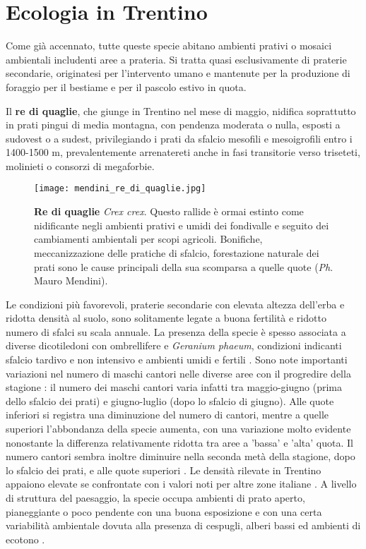\documentclass[10pt,twoside,openany,x11names,svgnames,italian,a5paper,dvipsnames,table]{memoir}
\newcommand{\ph}{\emph{Ph}. }
\begin{document}
\section{Ecologia in Trentino}
Come già accennato, tutte queste specie abitano ambienti prativi o mosaici ambientali includenti aree a prateria. Si tratta quasi esclusivamente di praterie secondarie, originatesi per l'intervento umano e mantenute per la produzione di foraggio per il bestiame e per il pascolo estivo in quota. 


Il \textbf{re di quaglie}, che giunge in Trentino nel mese di maggio, nidifica  soprattutto in prati pingui di media montagna, con pendenza moderata o nulla, esposti a sudovest o a sudest, privilegiando i prati da sfalcio mesofili e mesoigrofili entro i 1400-1500 m, prevalentemente arrenatereti anche in fasi transitorie verso triseteti, molinieti o consorzi di megaforbie.

 \begin{wrapfigure}[31]{l}{.6\columnwidth}
\centering
  \texttt{[image: mendini\_re\_di\_quaglie.jpg]}
  \caption*{\textbf{Re di quaglie} \emph{Crex crex}. Questo rallide è ormai estinto come nidificante negli ambienti prativi e umidi dei fondivalle e seguito dei cambiamenti ambientali per scopi agricoli. Bonifiche, meccanizzazione delle pratiche di sfalcio, forestazione naturale dei prati sono le cause principali della sua scomparsa a quelle quote (\ph Mauro Mendini).}
\end{wrapfigure}

Le condizioni più favorevoli, praterie secondarie con elevata altezza dell’erba e ridotta densità al suolo, sono solitamente legate a buona fertilità e ridotto numero di sfalci su scala annuale. La presenza della specie è spesso associata a diverse dicotiledoni con ombrellifere e \emph{Geranium phaeum}, condizioni indicanti sfalcio tardivo e non intensivo e ambienti umidi e fertili \cite{Pedrini02} \cite{Pedrini05}. Sono note importanti variazioni nel numero di maschi cantori nelle diverse aree con il progredire della stagione \cite{Brambilla11}: il numero dei maschi cantori varia infatti tra maggio-giugno (prima dello sfalcio dei prati) e giugno-luglio (dopo lo sfalcio di giugno). Alle quote inferiori si registra una diminuzione del numero di cantori, mentre a quelle superiori l’abbondanza della specie aumenta, con una variazione molto evidente nonostante la differenza relativamente ridotta tra aree a 'bassa' e 'alta' quota. Il numero cantori sembra inoltre diminuire nella seconda metà della stagione, dopo lo sfalcio dei prati, e alle quote superiori \cite{Brambilla11}. Le densità  rilevate in Trentino appaiono elevate se confrontate con i valori noti per altre zone italiane \cite{Pedrini12}. A livello di struttura del paesaggio, la specie occupa ambienti di prato aperto, pianeggiante o poco pendente con una buona esposizione e con una certa variabilità ambientale dovuta alla presenza di cespugli, alberi bassi ed ambienti di ecotono \cite{Pedrini05}.
\end{document}
